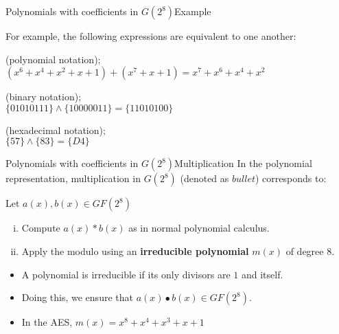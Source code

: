 \begin{frame}[t]{Polynomials with coefficients in $G(2^8)$}{Example}
	
	For example, the following expressions are equivalent to one another: 
	\medskip
	
	(polynomial notation);
	$(x^6 + x^4 + x^2 + x + 1) + (x^7 + x + 1) = x^7 + x^6 + x^4 + x^2$ 
	
	\bigskip
	
	(binary notation); \\
	$\{01010111\} \wedge \{10000011\} = \{11010100\}$
	
	\bigskip
	
	(hexadecimal notation);	\\	
	$\{57\} \wedge \{83\} = \{D4\}$ 	


\end{frame}

\begin{frame}[t]{Polynomials with coefficients in $G(2^8)$}{Multiplication}
	In the polynomial representation, multiplication in $G(2^8)$ (denoted as $bullet$) corresponds to:
	
	\medskip
	
	Let $a(x), b(x) \in GF(2^8)$ 
	
	\begin{enumerate}[i.]
		\item Compute $a(x) * b(x)$ as in normal polynomial calculus.
		\item Apply the modulo using an \textbf{irreducible polynomial} $m(x)$ of degree $8$.
	
	\end{enumerate}
	\begin{itemize}
		\item A polynomial is irreducible if its only divisors are $1$ and itself.
		\item Doing this, we ensure that $a(x) \bullet b(x) \in GF(2^8)$.
		\item In the AES, $m(x) = x^8 + x^4 + x^3 + x + 1$
	\end{itemize}
	
\end{frame}


